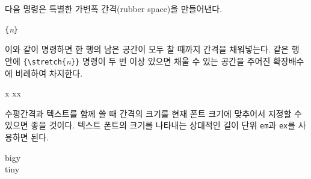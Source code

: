 \label{cmd:stretch}
다음 명령은 특별한 가변폭 간격(rubber space)을 만들어낸다.
\begin{lscommand}
\verb|{|\emph{n}\verb|}|
\end{lscommand}
\noindent 이와 같이 명령하면 한 행의 남은 공간이 모두 찰 때까지 간격을 채워넣는다.
같은 행 안에 \verb|{\stretch{|\emph{n}\verb|}}|
명령이 두 번 이상 있으면 채울 수 있는 공간을 주어진 확장배수에 비례하여 차지한다.

\begin{example}
x
xx
\end{example}

수평간격과 텍스트를 함께 쓸 때 간격의 크기를 현재 폰트 크기에 맞추어서 지정할 수 있으면 좋을 것이다. 텍스트 폰트의 크기를 나타내는 상대적인 길이 단위 \texttt{em}과 \texttt{ex}를 사용하면 된다.%

\begin{example}
{\Large{}big\hspace{1em}y}\\
{\tiny{}tin\hspace{1em}y}
\end{example}



